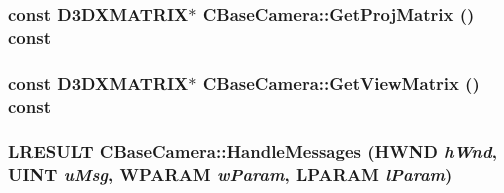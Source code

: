 \label{class_c_base_camera_ab99c79000b2d4fbf59c181032bccb95d}
\hypertarget{class_c_base_camera_abd1fd54b7481f136ff160528caac139a}{
\subsubsection[{GetProjMatrix}]{\setlength{\rightskip}{0pt plus 5cm}const D3DXMATRIX$\ast$ CBaseCamera::GetProjMatrix () const}}
\label{class_c_base_camera_abd1fd54b7481f136ff160528caac139a}
\hypertarget{class_c_base_camera_a10c93bd976787aec5b71daecd3448047}{
\subsubsection[{GetViewMatrix}]{\setlength{\rightskip}{0pt plus 5cm}const D3DXMATRIX$\ast$ CBaseCamera::GetViewMatrix () const}}
\label{class_c_base_camera_a10c93bd976787aec5b71daecd3448047}
\hypertarget{class_c_base_camera_a77cc040ed2d0b3479412b81316beb793}{
\subsubsection[{HandleMessages}]{\setlength{\rightskip}{0pt plus 5cm}LRESULT CBaseCamera::HandleMessages (HWND {\em hWnd}, \/  UINT {\em uMsg}, \/  WPARAM {\em wParam}, \/  LPARAM {\em lParam})}}
\label{class_c_base_camera_a77cc040ed2d0b3479412b81316beb793}


